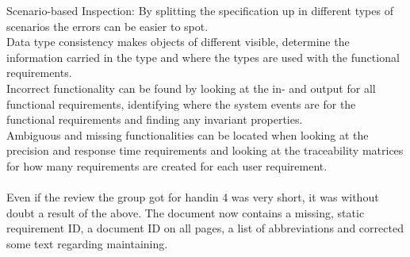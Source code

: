 \documentclass[Main]{subfiles}
\begin{document}
Scenario-based Inspection:
By splitting the specification up in different types of scenarios the errors can be easier to spot.
\\
Data type consistency makes objects of different visible, determine the information carried in the type and where the types are used with the functional requirements.
\\
Incorrect functionality can be found by looking at the in- and output for all functional requirements, identifying where the system events are for the functional requirements and finding any invariant properties.
\\
Ambiguous and missing functionalities can be located when looking at the precision and response time requirements and looking at the traceability matrices for how many requirements are created for each user requirement.
\\
\\
Even if the review the group got for handin 4 was very short, it was without doubt a result of the above.
The document now contains a missing, static requirement ID, a document ID on all pages, a list of abbreviations and corrected some text regarding maintaining.
\end{document}
